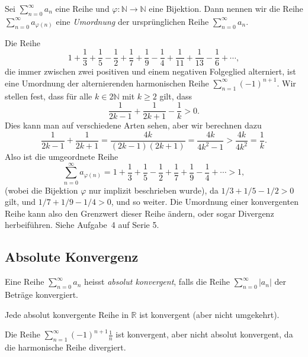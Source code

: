 \documentclass[../main.tex]{subfiles}
\begin{document}
\begin{definition}
  Sei $\sum_{n=0}^{\infty} a_n$ eine Reihe und
  $\varphi \colon \mathbb{N} \to \mathbb{N}$ eine
  Bijektion. Dann nennen wir die Reihe
  $\sum_{n=0}^{\infty} a_{\varphi(n)}$ eine
  \emph{Umordnung} der ursprünglichen
  Reihe $\sum_{n=0}^{\infty} a_n$.
\end{definition}

\begin{example}
  Die Reihe
  \[
    1 + \frac{1}{3} + \frac{1}{5} - \frac{1}{2}
    + \frac{1}{7} + \frac{1}{9} - \frac{1}{4}
    + \frac{1}{11} + \frac{1}{13} - \frac{1}{6}
    + \cdots,
  \]
  die immer zwischen zwei positiven und einem
  negativen Folgeglied alterniert,
  ist eine Umordnung der
  alternierenden harmonischen Reihe
  $\sum_{n=1}^{\infty} {(-1)}^{n+1}$.
  Wir stellen fest, dass für alle
  $k \in 2 \mathbb{N}$ mit $k \geq 2$ gilt,
  dass
  \[
    \frac{1}{2k-1} + \frac{1}{2k+1} - \frac{1}{k} > 0.
  \]
  Dies kann man auf verschiedene Arten sehen,
  aber wir berechnen dazu
  \[
    \frac{1}{2k-1} + \frac{1}{2k+1} = \frac{4k}{(2k-1)(2k+1)}
    = \frac{4k}{4k^2 - 1} > \frac{4k}{4k^2} = \frac{1}{k}.
  \]
  Also ist die umgeordnete Reihe
  \[
    \sum_{n=0}^{\infty} a_{\varphi(n)} = 
    1 + \frac{1}{3} + \frac{1}{5} - \frac{1}{2}
    + \frac{1}{7} + \frac{1}{9} - \frac{1}{4} + \cdots > 1,
  \]
  (wobei die Bijektion $\varphi$ nur implizit
  beschrieben wurde), da
  $1/3 + 1/5 - 1/2 > 0$ gilt, und $1/7 + 1/9 - 1/4 > 0$,
  und so weiter.
  Die Umordnung einer konvergenten Reihe kann also den
  Grenzwert dieser Reihe ändern,
  oder sogar Divergenz herbeiführen. Siehe Aufgabe~4
  auf Serie 5.
\end{example}

\subsection*{Absolute Konvergenz}
\begin{definition}
  Eine Reihe $\sum_{n=0}^{\infty} a_n$ heisst
  \emph{absolut konvergent}, falls die Reihe
  $\sum_{n=0}^{\infty} |a_n|$ der Beträge konvergiert.
\end{definition}

\begin{lemma}
  Jede absolut konvergente Reihe in
  $\mathbb{R}$ ist konvergent (aber nicht umgekehrt).
\end{lemma}

\begin{example}
  Die Reihe
  $\sum_{n=1}^{\infty} {(-1)}^{n+1}\frac{1}{n}$ 
  ist konvergent, aber
  nicht absolut konvergent, da die harmonische Reihe divergiert.
\end{example}
\end{document}
